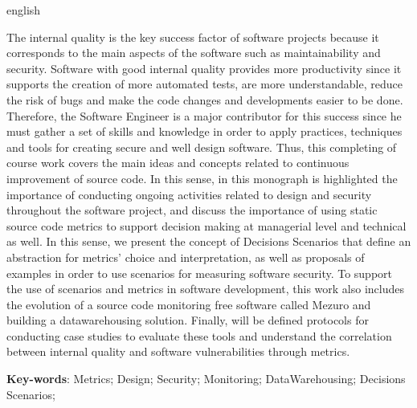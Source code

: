 \begin{resumo}[Abstract]
  \begin{otherlanguage*}{english} 
  
The internal quality is the key success factor of software projects because it corresponds to the main aspects of the software such as maintainability and security. Software with good internal quality provides more productivity since it supports the creation of more automated tests, are more understandable, reduce the risk of bugs and make the code changes and developments easier to be done. Therefore, the Software Engineer is a major contributor for this success since he must gather a set of skills and knowledge in order to apply practices, techniques and tools for creating secure and well design software. Thus, this completing of course work covers the main ideas and concepts related to continuous improvement of source code. In this sense, in this monograph is highlighted the importance of conducting ongoing activities related to design and security throughout the software project, and discuss the importance of using static source code metrics to support decision making at managerial level and technical as well. In this sense, we present the concept of Decisions Scenarios that define an abstraction for metrics' choice and interpretation, as well as proposals of examples in order to use scenarios for measuring software security. To support the use of scenarios and metrics in software development, this work also includes the evolution of a source code monitoring free software called Mezuro and building a datawarehousing solution. Finally, will be defined protocols for conducting case studies to evaluate these tools and understand the correlation between internal quality and software vulnerabilities through metrics.
  
  \vspace{\onelineskip}
 
  \noindent 
  \textbf{Key-words}: Metrics; Design; Security; Monitoring; DataWarehousing; Decisions Scenarios;
  \end{otherlanguage*}
\end{resumo}


